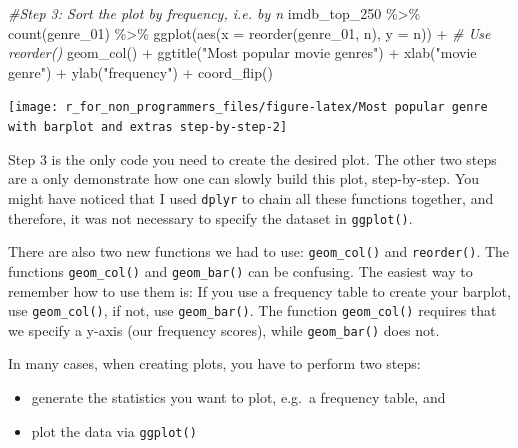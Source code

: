\documentclass[
]{book}
\newenvironment{Shaded}{\begin{snugshade}}{\end{snugshade}}
\newcommand{\AttributeTok}[1]{\textcolor[rgb]{0.77,0.63,0.00}{#1}}
\newcommand{\CommentTok}[1]{\textcolor[rgb]{0.56,0.35,0.01}{\textit{#1}}}
\newcommand{\FunctionTok}[1]{\textcolor[rgb]{0.00,0.00,0.00}{#1}}
\newcommand{\NormalTok}[1]{#1}
\newcommand{\SpecialCharTok}[1]{\textcolor[rgb]{0.00,0.00,0.00}{#1}}
\newcommand{\StringTok}[1]{\textcolor[rgb]{0.31,0.60,0.02}{#1}}
\begin{document}
\begin{Shaded}
\begin{Highlighting}[]
\CommentTok{\#Step 3: Sort the plot by frequency, i.e. by \textquotesingle{}n\textquotesingle{}}
\NormalTok{imdb\_top\_250 }\SpecialCharTok{\%\textgreater{}\%}
  \FunctionTok{count}\NormalTok{(genre\_01) }\SpecialCharTok{\%\textgreater{}\%}
  \FunctionTok{ggplot}\NormalTok{(}\FunctionTok{aes}\NormalTok{(}\AttributeTok{x =} \FunctionTok{reorder}\NormalTok{(genre\_01, n), }\AttributeTok{y =}\NormalTok{ n)) }\SpecialCharTok{+}  \CommentTok{\# Use \textquotesingle{}reorder()\textquotesingle{}}
  \FunctionTok{geom\_col}\NormalTok{() }\SpecialCharTok{+}
  \FunctionTok{ggtitle}\NormalTok{(}\StringTok{"Most popular movie genres"}\NormalTok{) }\SpecialCharTok{+}
  \FunctionTok{xlab}\NormalTok{(}\StringTok{"movie genre"}\NormalTok{) }\SpecialCharTok{+}
  \FunctionTok{ylab}\NormalTok{(}\StringTok{"frequency"}\NormalTok{) }\SpecialCharTok{+}
  \FunctionTok{coord\_flip}\NormalTok{()}
\end{Highlighting}
\end{Shaded}

\begin{center}\texttt{[image: r\_for\_non\_programmers\_files/figure-latex/Most popular genre with barplot and extras step-by-step-2]} \end{center}

Step 3 is the only code you need to create the desired plot. The other two steps are a only demonstrate how one can slowly build this plot, step-by-step. You might have noticed that I used \texttt{dplyr} to chain all these functions together, and therefore, it was not necessary to specify the dataset in \texttt{ggplot()}.

There are also two new functions we had to use: \texttt{geom\_col()} and \texttt{reorder()}. The functions \texttt{geom\_col()} and \texttt{geom\_bar()} can be confusing. The easiest way to remember how to use them is: If you use a frequency table to create your barplot, use \texttt{geom\_col()}, if not, use \texttt{geom\_bar()}. The function \texttt{geom\_col()} requires that we specify a y-axis (our frequency scores), while \texttt{geom\_bar()} does not.

In many cases, when creating plots, you have to perform two steps:

\begin{itemize}
\item
  generate the statistics you want to plot, e.g.~a frequency table, and
\item
  plot the data via \texttt{ggplot()}
\end{itemize}
\end{document}
